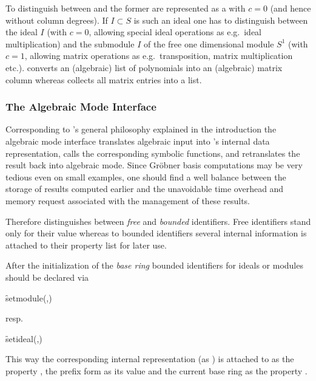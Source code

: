 To distinguish between  and  the former are
represented as a  with $c=0$ (and hence without column
degrees).  If $I \subset S$ is such an ideal one has to distinguish
between the ideal $I$ (with $c=0$, allowing special ideal operations
as e.g.\ ideal multiplication) and the submodule $I$ of the free
one dimensional module $S^1$ (with $c=1$, allowing matrix operations
as e.g.\  transposition, matrix multiplication etc.). 
converts an (algebraic) list of polynomials into an (algebraic)
matrix column whereas  collects all matrix entries into
a list.

\subsubsection{The Algebraic Mode Interface}

Corresponding to 's general philosophy explained in the
introduction the algebraic mode interface translates algebraic input
into 's internal data representation, calls the corresponding
symbolic functions, and retranslates the result back into algebraic
mode. Since Gr\"obner basis computations may be very tedious even on small
examples, one should find a well balance between the storage of
results computed earlier and the unavoidable time overhead and memory
request associated with the management of these results.

Therefore  distinguishes between \emph{free} and \emph{bounded}
 identifiers. Free
identifiers stand only for their value whereas to bounded identifiers
several internal information is attached to their property list for
later use.
\medskip

After the initialization of the \emph{base ring} bounded identifiers
for ideals or modules should be declared via
\hypertarget{operator:SETMODULE}{}
\hypertarget{operator:SETIDEAL}{}
\begin{syntax}
\f{setmodule}(,)
\end{syntax}
resp.
\begin{syntax}
\f{setideal}(,)
\end{syntax}
This way the corresponding internal representation (as )
is attached to  as the property , the prefix
form as its value and the current base ring as the property
.


